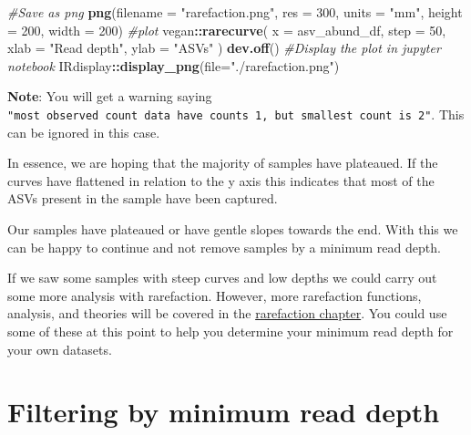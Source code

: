 \documentclass[
]{book}
\newenvironment{Shaded}{\begin{snugshade}}{\end{snugshade}}
\newcommand{\AttributeTok}[1]{\textcolor[rgb]{0.13,0.29,0.53}{#1}}
\newcommand{\CommentTok}[1]{\textcolor[rgb]{0.56,0.35,0.01}{\textit{#1}}}
\newcommand{\DecValTok}[1]{\textcolor[rgb]{0.00,0.00,0.81}{#1}}
\newcommand{\FunctionTok}[1]{\textcolor[rgb]{0.13,0.29,0.53}{\textbf{#1}}}
\newcommand{\NormalTok}[1]{#1}
\newcommand{\SpecialCharTok}[1]{\textcolor[rgb]{0.81,0.36,0.00}{\textbf{#1}}}
\newcommand{\StringTok}[1]{\textcolor[rgb]{0.31,0.60,0.02}{#1}}
\begin{document}
\begin{Shaded}
\begin{Highlighting}[]
\CommentTok{\#Save as png}
\FunctionTok{png}\NormalTok{(}\AttributeTok{filename =} \StringTok{"rarefaction.png"}\NormalTok{, }\AttributeTok{res =} \DecValTok{300}\NormalTok{,}
    \AttributeTok{units =} \StringTok{"mm"}\NormalTok{, }\AttributeTok{height =} \DecValTok{200}\NormalTok{, }\AttributeTok{width =} \DecValTok{200}\NormalTok{)}
\CommentTok{\#plot}
\NormalTok{vegan}\SpecialCharTok{::}\FunctionTok{rarecurve}\NormalTok{(}
  \AttributeTok{x =}\NormalTok{ asv\_abund\_df, }\AttributeTok{step =} \DecValTok{50}\NormalTok{,}
  \AttributeTok{xlab =} \StringTok{"Read depth"}\NormalTok{,}
  \AttributeTok{ylab =} \StringTok{"ASVs"}
\NormalTok{)}
\FunctionTok{dev.off}\NormalTok{()}
\CommentTok{\#Display the plot in jupyter notebook}
\NormalTok{IRdisplay}\SpecialCharTok{::}\FunctionTok{display\_png}\NormalTok{(}\AttributeTok{file=}\StringTok{"./rarefaction.png"}\NormalTok{)}
\end{Highlighting}
\end{Shaded}

\textbf{Note}: You will get a warning saying \texttt{"most\ observed\ count\ data\ have\ counts\ 1,\ but\ smallest\ count\ is\ 2"}. This can be ignored in this case.

In essence, we are hoping that the majority of samples have plateaued.
If the curves have flattened in relation to the y axis this indicates that most of the ASVs present in the sample have been captured.

Our samples have plateaued or have gentle slopes towards the end.
With this we can be happy to continue and not remove samples by a minimum read depth.

If we saw some samples with steep curves and low depths we could carry out some more analysis with rarefaction.
However, more rarefaction functions, analysis, and theories will be covered in the \protect\hyperlink{rarefaction_chap}{rarefaction chapter}.
You could use some of these at this point to help you determine your minimum read depth for your own datasets.

\hypertarget{filtering-by-minimum-read-depth}{%
\section{Filtering by minimum read depth}\label{filtering-by-minimum-read-depth}}
\end{document}
